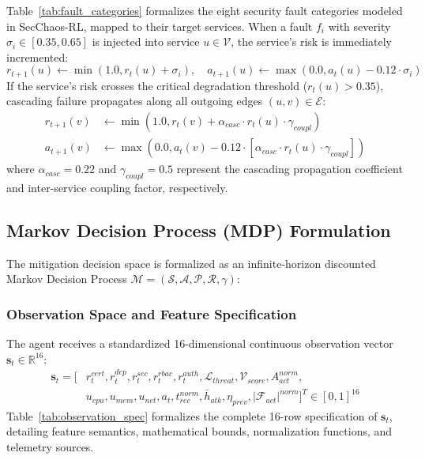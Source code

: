 \documentclass[11pt,a4paper]{article}
\begin{document}
Table~\ref{tab:fault_categories} formalizes the eight security fault categories modeled in SecChaos-RL, mapped to their target services. When a fault $f_i$ with severity $\sigma_i \in [0.35, 0.65]$ is injected into service $u \in \mathcal{V}$, the service's risk is immediately incremented:
\begin{equation}
    r_{t+1}(u) \leftarrow \min\left(1.0, r_t(u) + \sigma_i\right), \quad a_{t+1}(u) \leftarrow \max\left(0.0, a_t(u) - 0.12 \cdot \sigma_i\right)
\end{equation}
If the service's risk crosses the critical degradation threshold ($r_t(u) > 0.35$), cascading failure propagates along all outgoing edges $(u, v) \in \mathcal{E}$:
\begin{align}
    r_{t+1}(v) &\leftarrow \min\left(1.0, r_t(v) + \alpha_{casc} \cdot r_t(u) \cdot \gamma_{coupl}\right) \\
    a_{t+1}(v) &\leftarrow \max\left(0.0, a_t(v) - 0.12 \cdot \left[\alpha_{casc} \cdot r_t(u) \cdot \gamma_{coupl}\right]\right)
\end{align}
where $\alpha_{casc} = 0.22$ and $\gamma_{coupl} = 0.5$ represent the cascading propagation coefficient and inter-service coupling factor, respectively.

\subsection{Markov Decision Process (MDP) Formulation}
The mitigation decision space is formalized as an infinite-horizon discounted Markov Decision Process $\mathcal{M} = (\mathcal{S}, \mathcal{A}, \mathcal{P}, \mathcal{R}, \gamma)$:

\subsubsection{Observation Space and Feature Specification}
The agent receives a standardized 16-dimensional continuous observation vector $\mathbf{s}_t \in \mathbb{R}^{16}$:
\begin{align}
    \mathbf{s}_t = \big[ & r_t^{cert}, r_t^{dep}, r_t^{sec}, r_t^{rbac}, r_t^{auth}, \mathcal{L}_{threat}, \mathcal{V}_{score}, A_{act}^{norm}, \nonumber \\
    & u_{cpu}, u_{mem}, u_{net}, a_t, t_{rec}^{norm}, \bar{h}_{atk}, \eta_{prev}, |\mathcal{F}_{act}|^{norm} \big]^T \in [0, 1]^{16}
\end{align}
Table~\ref{tab:observation_spec} formalizes the complete 16-row specification of $\mathbf{s}_t$, detailing feature semantics, mathematical bounds, normalization functions, and telemetry sources.
\end{document}
